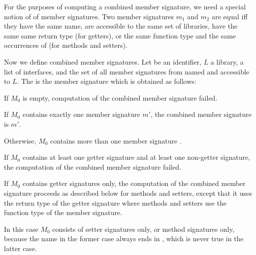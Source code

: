 \documentclass[makeidx]{article}
\begin{document}
\LMHash{}%
For the purposes of computing a combined member signature,
we need a special notion of
of member signatures.
Two member signatures $m_1$ and $m_2$ are equal
if{}f they have the same name,
are accessible to the same set of libraries,
have the same same return type (for getters),
or the same function type and the same occurrences of \COVARIANT{}
(for methods and setters).


\LMHash{}%
%
Now we define combined member signatures.
Let \id{} be an identifier, $L$ a library,
 a list of interfaces,
and  the set of
all member signatures from  named \id{}
and accessible to $L$.
The
is the member signature which is obtained as follows:

\LMHash{}%
If $M_0$ is empty, computation of the combined member signature failed.

\LMHash{}%
If $M_0$ contains exactly one member signature $m'$,
the combined member signature is $m'$.

\LMHash{}%
Otherwise, $M_0$ contains more than one member signature
.

\LMHash{}%
If $M_0$ contains at least one getter signature
and at least one non-getter signature,
the computation of the combined member signature failed.
\EndCase

\LMHash{}%
If $M_0$ contains getter signatures only,
the computation of the combined member signature proceeds as described below
for methods and setters,
except that it uses the return type of the getter signature
where methods and setters use the function type of the member signature.
\EndCase

\LMHash{}%
In this case $M_0$ consists of setter signatures only,
or method signatures only,
because the name \id{} in the former case always ends in \lit{=},
which is never true in the latter case.
\end{document}
